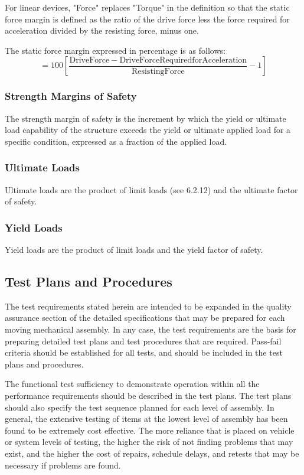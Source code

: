 \documentclass[12pt]{article}
\begin{document}
For linear devices, "Force" replaces "Torque" in the definition so that the static force margin is defined as the ratio of the drive force less the force required for acceleration divided by the resisting force, minus one.

The static force margin expressed in percentage is as follows:
$$ = 100 \left[ \frac{\mathrm{Drive Force - Drive Force Required for Acceleration}}{\mathrm{Resisting Force}} - 1\right] $$

\subsubsection{Strength Margins of Safety}
The strength margin of safety is the increment by which the yield or ultimate load capability of the structure exceeds the yield or ultimate applied load for a specific condition, expressed as a fraction of the applied load.

\subsubsection{Ultimate Loads}
Ultimate loads are the product of limit loads (see 6.2.12) and the ultimate factor of safety.

\subsubsection{Yield Loads}
Yield loads are the product of limit loads and the yield factor of safety.

\subsection{Test Plans and Procedures} %
The test requirements stated herein are intended to be expanded in the quality assurance section of the detailed specifications that may be prepared for each moving mechanical assembly. 
In any case, the test requirements are the basis for preparing detailed test plans and test procedures that are required. Pass-fail criteria should be established for all tests, and should be included in the test plans and procedures.

The functional test sufficiency to demonstrate operation within all the performance requirements should be described in the test plans. 
The test plans should also specify the test sequence planned for each level of assembly. 
In general, the extensive testing of items at the lowest level of assembly has been found to be extremely cost effective. 
The more reliance that is placed on vehicle or system levels of testing, the higher the risk of not finding problems that may exist, and the higher the cost of repairs, schedule delays, and retests that may be necessary if problems are found.
\end{document}
